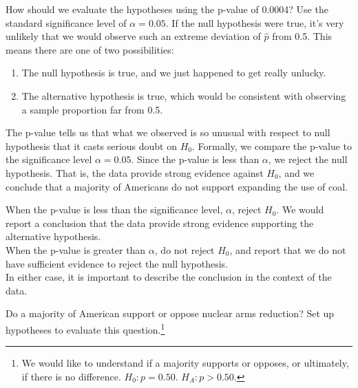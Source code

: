 \begin{example}{How should we evaluate the hypotheses using the
    p-value of 0.0004? Use the standard significance level of
    $\alpha = 0.05$.}
  If the null hypothesis were true, it's very unlikely that we would
  observe such an extreme deviation of $\hat{p}$ from 0.5. This means
  there are one of two possibilities:
  \begin{enumerate}
    \item The null hypothesis is true, and we just happened to get
        really unlucky.
    \item The alternative hypothesis is true, which would be consistent
        with observing a sample proportion far from 0.5.
  \end{enumerate}
  The p-value tells us that what we observed is so unusual
  with respect to null hypothesis that it casts serious doubt on $H_0$.
  Formally, we compare the p-value to the significance level
  $\alpha = 0.05$. Since the p-value is less than $\alpha$,
  we reject the null hypothesis.
  That is, the data provide strong evidence against $H_0$,
  and we conclude that a majority of Americans do not support
  expanding the use of coal.
\end{example}


\begin{tipBox}{
  When the p-value is less than the significance level, $\alpha$,
  reject $H_0$. We would report a conclusion that the data provide
  strong evidence supporting the alternative hypothesis. \\[2mm]
  When the p-value is greater than $\alpha$, do not reject $H_0$,
  and report that we do not have sufficient evidence to reject the
  null hypothesis. \\[2mm]
  In either case, it is important to describe the conclusion
  in the context of the data.}
\end{tipBox}








\begin{exercise}
Do a majority of American support or oppose nuclear arms reduction? Set up hypotheses to evaluate this question.\footnote{We would like to understand if a majority supports or opposes, or ultimately, if there is no difference. $H_0: p = 0.50$. $H_A: p > 0.50$.}
\end{exercise}

